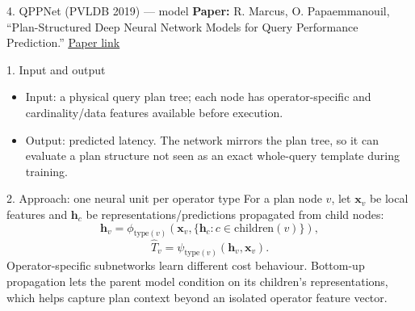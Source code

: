 \documentclass[aspectratio=169,10pt]{beamer}
\newcommand{\paperlink}[2]{\href{#1}{\textcolor{WayangTeal}{\underline{#2}}}}
\begin{document}
\begin{frame}[shrink=10]{4. QPPNet (PVLDB 2019) — model}
\small
\textbf{Paper:} R. Marcus, O. Papaemmanouil, ``Plan-Structured Deep Neural Network Models for Query Performance Prediction.''
\hfill\paperlink{https://doi.org/10.14778/3368289.3368296}{Paper link}

\begin{block}{1. Input and output}
\begin{itemize}\setlength\itemsep{1pt}
  \item Input: a physical query plan tree; each node has operator-specific and cardinality/data features available before execution.
  \item Output: predicted latency. The network mirrors the plan tree, so it can evaluate a plan structure not seen as an exact whole-query template during training.
\end{itemize}
\end{block}

\begin{block}{2. Approach: one neural unit per operator type}
For a plan node $v$, let $\mathbf x_v$ be local features and $\mathbf h_c$ be representations/predictions propagated from child nodes:
\[
  \mathbf h_v=\phi_{\mathrm{type}(v)}\!\left(\mathbf x_v,\{\mathbf h_c:c\in\mathrm{children}(v)\}\right),
\]
\[
  \widehat T_v=\psi_{\mathrm{type}(v)}(\mathbf h_v,\mathbf x_v).
\]
Operator-specific subnetworks learn different cost behaviour. Bottom-up propagation lets the parent model condition on its children's representations, which helps capture plan context beyond an isolated operator feature vector.
\end{block}
\end{frame}
\end{document}
